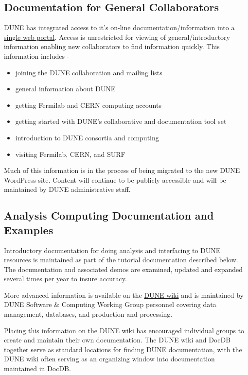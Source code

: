 \subsection{Documentation for General Collaborators}
DUNE has integrated access to it's on-line documentation/information into a \href{https://web.fnal.gov/collaboration/DUNE/SitePages/Home.aspx}{single web portal}. Access is unrestricted for viewing of general/introductory information enabling new collaborators to find information quickly. This information includes -
\begin{itemize}
\item joining the DUNE collaboration and mailing lists
\item general information about DUNE
\item getting Fermilab and CERN computing accounts
\item getting started with DUNE's collaborative and documentation tool set
\item introduction to DUNE consortia and computing
\item visiting Fermilab, CERN, and SURF
\end{itemize}
Much of this information is in the process of being migrated to the new DUNE WordPress site.  Content will continue to be publicly accessible and will be maintained by DUNE administrative staff.

\subsection{Analysis Computing Documentation and Examples}
Introductory documentation for doing analysis and interfacing to DUNE resources is maintained as part of the tutorial documentation described below. The documentation and associated demos are examined, updated and expanded several times per year to insure accuracy.

More advanced information is available on the \href{https://wiki.dunescience.org/wiki/DUNE_Computing}{DUNE wiki} and is maintained by DUNE Software \& Computing Working Group personnel covering data management, databases, and production and processing.

Placing this information on the DUNE wiki has encouraged individual groups to create and maintain their own documentation.  The DUNE wiki and DocDB together serve as standard locations for finding DUNE documentation, with the DUNE wiki often serving as an organizing window into documentation maintained in DocDB.  

